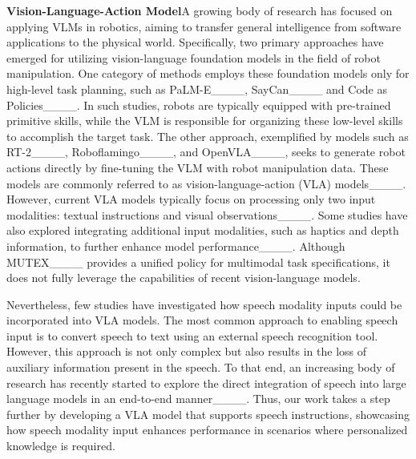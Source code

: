 \textbf{Vision-Language-Action Model}\quad A growing body of research has focused on applying VLMs in robotics, aiming to transfer general intelligence from software applications to the physical world. Specifically, two primary approaches have emerged for utilizing vision-language foundation models in the field of robot manipulation. One category of methods employs these foundation models only for high-level task planning, such as PaLM-E____, SayCan____ and Code as Policies____. In such studies, robots are typically equipped with pre-trained primitive skills, while the VLM is responsible for organizing these low-level skills to accomplish the target task. The other approach, exemplified by models such as RT-2____, Roboflamingo____, and OpenVLA____, seeks to generate robot actions directly by fine-tuning the VLM with robot manipulation data. These models are commonly referred to as vision-language-action (VLA) models____. However, current VLA models typically focus on processing only two input modalities: textual instructions and visual observations____. Some studies have also explored integrating additional input modalities, such as haptics and depth information, to further enhance model performance____. Although MUTEX____ provides a unified policy for multimodal task specifications, it does not fully leverage the capabilities of recent vision-language models.

Nevertheless, few studies have investigated how speech modality inputs could be incorporated into VLA models. The most common approach to enabling speech input is to convert speech to text using an external speech recognition tool. However, this approach is not only complex but also results in the loss of auxiliary information present in the speech. To that end, an increasing body of research has recently started to explore the direct integration of speech into large language models in an end-to-end manner____. Thus, our work takes a step further by developing a VLA model that supports speech instructions, showcasing how speech modality input enhances performance in scenarios where personalized knowledge is required.
